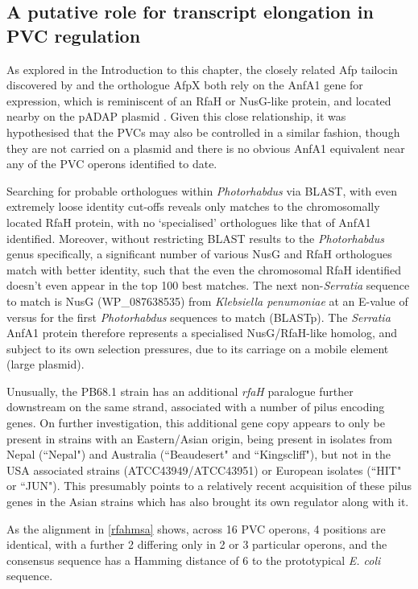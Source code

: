 \subsection{A putative role for transcript elongation in PVC regulation}\label{elongation}
As explored in the Introduction to this chapter, the closely related Afp tailocin discovered by \cite{Hurst2004} and the orthologue AfpX \citep{Hurst2018} both rely on the AnfA1 gene for expression, which is reminiscent of an RfaH or NusG-like protein, and located nearby on the pADAP plasmid \citep{Hurst2007a}. Given this close relationship, it was hypothesised that the PVCs may also be controlled in a similar fashion, though they are not carried on a plasmid and there is no obvious AnfA1 equivalent near any of the PVC operons identified to date.

Searching for probable orthologues within \emph{Photorhabdus} via BLAST, with even extremely loose identity cut-offs reveals only matches to the chromosomally located RfaH protein, with no `specialised' orthologues like that of AnfA1 identified. Moreover, without restricting BLAST results to the \emph{Photorhabdus} genus specifically, a significant number of various NusG and RfaH orthologues match with better identity, such that the even the chromosomal RfaH identified doesn't even appear in the top 100 best matches. The next non-\emph{Serratia} sequence to match is NusG (WP\_087638535) from \emph{Klebsiella penumoniae} at an E-value of  versus  for the first \emph{Photorhabdus} sequences to match (BLASTp). The \emph{Serratia} AnfA1 protein therefore represents a specialised NusG/RfaH-like homolog, and subject to its own selection pressures, due to its carriage on a mobile element (large plasmid).

Unusually, the PB68.1 strain has an additional \emph{rfaH} paralogue further downstream on the same strand, associated with a number of pilus encoding genes. On further investigation, this additional gene copy appears to only be present in \Pasy{} strains with an Eastern/Asian origin, being present in isolates from Nepal (``Nepal") and Australia (``Beaudesert" and ``Kingscliff"), but not in the USA associated strains (ATCC43949/ATCC43951) or European isolates (``HIT" or ``JUN"). This presumably points to a relatively recent acquisition of these pilus genes in the Asian strains which has also brought its own regulator along with it.

As the alignment in \vref{rfahmsa} shows, across 16 PVC operons, 4 positions are identical, with a further 2 differing only in 2 or 3 particular operons, and the consensus sequence has a Hamming distance of 6 to the prototypical \emph{E. coli} sequence.


